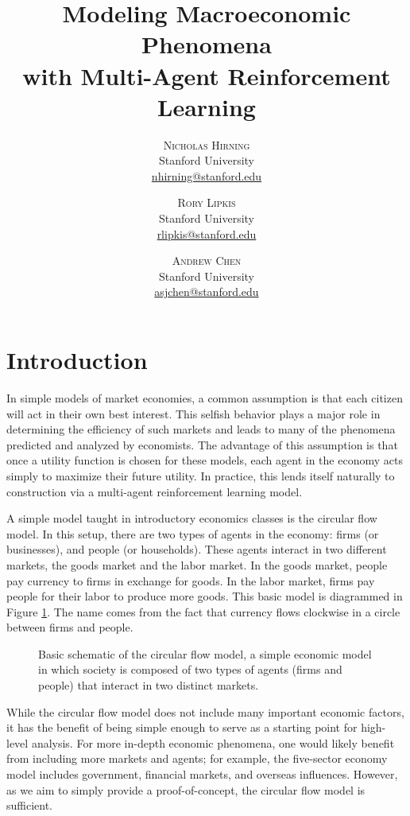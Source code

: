 \documentclass[twoside,twocolumn]{article}
\title{Modeling Macroeconomic Phenomena \\with Multi-Agent Reinforcement Learning} %
\author{%
\textsc{Nicholas Hirning} \\[1ex]
\normalsize Stanford University \\ 
\normalsize \href{mailto:nhirning@stanford.edu}{nhirning@stanford.edu}
\and
\textsc{Rory Lipkis} \\[1ex]
\normalsize Stanford University \\ 
\normalsize \href{mailto:rlipkis@stanford.edu}{rlipkis@stanford.edu}
\and
\textsc{Andrew Chen} \\[1ex]
\normalsize Stanford University \\ 
\normalsize \href{mailto:asjchen@stanford.edu}{asjchen@stanford.edu}
}
\date{} %
\begin{document}
\maketitle


\section{Introduction}

In simple models of market economies, a common assumption is that each citizen will act in their own best interest. This selfish behavior plays a major role in determining the efficiency of such markets and leads to many of the phenomena predicted and analyzed by economists. The advantage of this assumption is that once a utility function is chosen for these models, each agent in the economy acts simply to maximize their future utility. In practice, this lends itself naturally to construction via a multi-agent reinforcement learning model. 

\medskip

A simple model taught in introductory economics classes is the circular flow model. In this setup, there are two types of agents in the economy: firms (or businesses), and people (or households). These agents interact in two different markets, the goods market and the labor market. In the goods market, people pay currency to firms in exchange for goods. In the labor market, firms pay people for their labor to produce more goods. This basic model is diagrammed in Figure \ref{fig:circularflow}. The name comes from the fact that currency flows clockwise in a circle between firms and people.

\begin{figure}[h]
  \centering
  \caption{Basic schematic of the circular flow model, a simple economic model in which society is composed of two types of agents (firms and people) that interact in two distinct markets.} \label{fig:circularflow}
\end{figure}
\medskip
While the circular flow model does not include many important economic factors, it has the benefit of being simple enough to serve as a starting point for high-level analysis. For more in-depth economic phenomena, one would likely benefit from including more markets and agents; for example, the five-sector economy model includes government, financial markets, and overseas influences. However, as we aim to simply provide a proof-of-concept, the circular flow model is sufficient.
\end{document}
